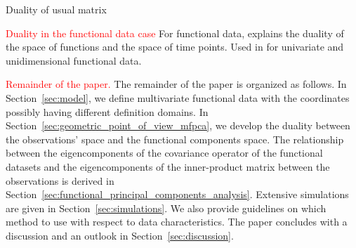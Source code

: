 Duality of usual matrix \cite{escofierTraitementSimultaneVariables1979,saportaSimultaneousAnalysisQualitative1990,pagesAnalyseFactorielleDonnees2004,hardleAppliedMultivariateStatistical2019}


\textcolor{red}{Duality in the functional data case}
For functional data, \cite{ramsayWhenDataAre1982a} explains the duality of the space of functions and the space of time points. Used in \cite{benkoCommonFunctionalPrincipal2009} for univariate and unidimensional functional data. \cite{chenQuantifyingInfiniteDimensionalData2017}


\textcolor{red}{Remainder of the paper.}
The remainder of the paper is organized as follows. In Section~\ref{sec:model}, we define multivariate functional data with the coordinates possibly having different definition domains. In Section~\ref{sec:geometric_point_of_view_mfpca}, we develop the duality between the observations' space and the functional components space. The relationship between the eigencomponents of the covariance operator of the functional datasets and the eigencomponents of the inner-product matrix between the observations is derived in Section~\ref{sec:functional_principal_components_analysis}. Extensive simulations are given in Section~\ref{sec:simulations}. We also provide guidelines on which method to use with respect to data characteristics. The paper concludes with a discussion and an outlook in Section~\ref{sec:discussion}.

